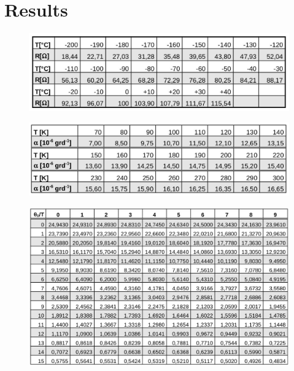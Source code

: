 \section{Results}
\label{sec:results}




\begin{figure}[H]
	\centering
	\includegraphics[width=0.6\linewidth]{content/graphics/resistance.jpg}
	\caption{\cite{molar_heat}}
	\label{fig:resistance}
\end{figure}

\begin{figure}[H]
	\centering
	\includegraphics[width=0.6\linewidth]{content/graphics/expansion.jpg}
	\caption{\cite{molar_heat}}
	\label{fig:expansion}
\end{figure}

\begin{figure}[H]
	\centering
	\includegraphics[width=0.8\linewidth]{content/graphics/ratio.jpg}
	\caption{\cite{molar_heat}}
	\label{fig:ratio}
\end{figure}
